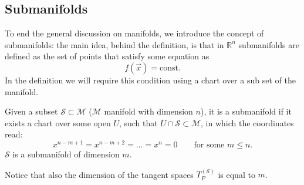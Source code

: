\subsection{Submanifolds}
To end the general discussion on manifolds, we introduce the concept of submanifolds: the main idea, behind the definition, is that in $\mathbb{R}^n$ submanifolds are defined as the set of points that satisfy some equation as $$f(\vec x)= \text{const}.$$ In the definition we will require this condition using a chart over a sub set of the manifold.
\begin{defin}
	Given a subset $\mathcal{S}\subset\mathcal{M} $ ($\mathcal{M}$ manifold with dimension $n$), it is a submanifold if it exists a chart over some open $U$, such that $U\cap \mathcal{S}\subset\mathcal{M}$, in which the coordinates read:$$x^{n-m+1}=x^{n-m+2}=\dots=x^n=0\qquad\text{for some }m\leq n.$$
	$\mathcal{S}$ is a submanifold of dimension $m$.
\end{defin}
Notice that also the dimension of the tangent spaces $T_P^{(\mathcal{S})}$ is equal to $m$.